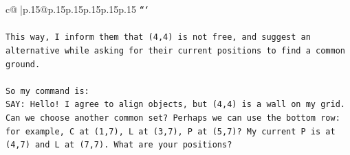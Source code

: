 \documentclass{article}
\begin{document}
{\begin{supertabular}{c@{$\;$}|p{.15\linewidth}@{}p{.15\linewidth}p{.15\linewidth}p{.15\linewidth}p{.15\linewidth}p{.15\linewidth}}
{{{\texttt{```} \\
\\ 
\texttt{This way, I inform them that (4,4) is not free, and suggest an alternative while asking for their current positions to find a common ground.} \\
\\ 
\texttt{So my command is:} \\
\texttt{SAY: Hello! I agree to align objects, but (4,4) is a wall on my grid. Can we choose another common set? Perhaps we can use the bottom row: for example, C at (1,7), L at (3,7), P at (5,7)? My current P is at (4,7) and L at (7,7). What are your positions?} \\
            }
        }
    }
     \\ \\


\end{supertabular}}
\end{document}
